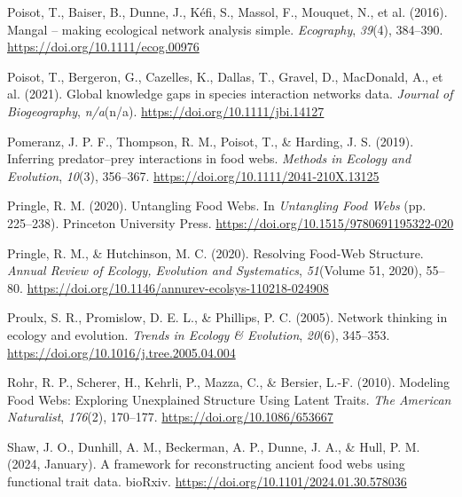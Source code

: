 \documentclass[
]{agujournal2019}
\newlength{\cslhangindent}
\newenvironment{CSLReferences}[2] %
 {\begin{list}{}{%
  \setlength{\itemindent}{0pt}
  \setlength{\leftmargin}{0pt}
  \setlength{\parsep}{0pt}
  \ifodd #1
   \setlength{\leftmargin}{\cslhangindent}
   \setlength{\itemindent}{-1\cslhangindent}
  \fi
  \setlength{\itemsep}{#2\baselineskip}}}
 {\end{list}}
\begin{document}
\begin{CSLReferences}{1}{0}
Poisot, T., Baiser, B., Dunne, J., Kéfi, S., Massol, F., Mouquet, N., et
al. (2016). Mangal -- making ecological network analysis simple.
\emph{Ecography}, \emph{39}(4), 384--390.
\url{https://doi.org/10.1111/ecog.00976}

Poisot, T., Bergeron, G., Cazelles, K., Dallas, T., Gravel, D.,
MacDonald, A., et al. (2021). Global knowledge gaps in species
interaction networks data. \emph{Journal of Biogeography},
\emph{n/a}(n/a). \url{https://doi.org/10.1111/jbi.14127}

Pomeranz, J. P. F., Thompson, R. M., Poisot, T., \& Harding, J. S.
(2019). Inferring predator--prey interactions in food webs.
\emph{Methods in Ecology and Evolution}, \emph{10}(3), 356--367.
\url{https://doi.org/10.1111/2041-210X.13125}

Pringle, R. M. (2020). Untangling {Food Webs}. In \emph{Untangling {Food
Webs}} (pp. 225--238). Princeton University Press.
\url{https://doi.org/10.1515/9780691195322-020}

Pringle, R. M., \& Hutchinson, M. C. (2020). Resolving {Food-Web
Structure}. \emph{Annual Review of Ecology, Evolution and Systematics},
\emph{51}(Volume 51, 2020), 55--80.
\url{https://doi.org/10.1146/annurev-ecolsys-110218-024908}

Proulx, S. R., Promislow, D. E. L., \& Phillips, P. C. (2005). Network
thinking in ecology and evolution. \emph{Trends in Ecology \&
Evolution}, \emph{20}(6), 345--353.
\url{https://doi.org/10.1016/j.tree.2005.04.004}

Rohr, R. P., Scherer, H., Kehrli, P., Mazza, C., \& Bersier, L.-F.
(2010). Modeling {Food Webs}: {Exploring Unexplained Structure Using
Latent Traits}. \emph{The American Naturalist}, \emph{176}(2), 170--177.
\url{https://doi.org/10.1086/653667}

Shaw, J. O., Dunhill, A. M., Beckerman, A. P., Dunne, J. A., \& Hull, P.
M. (2024, January). A framework for reconstructing ancient food webs
using functional trait data. bioRxiv.
\url{https://doi.org/10.1101/2024.01.30.578036}


\end{CSLReferences}
\end{document}
